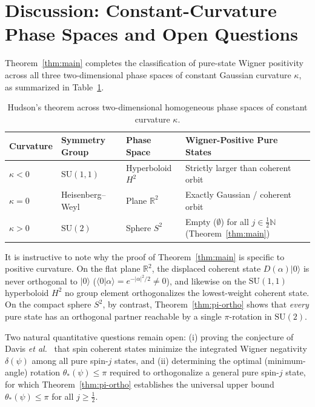 \documentclass[11pt,a4paper]{article}
\theoremstyle{remark}
\newcommand{\ket}[1]{\lvert #1 \rangle}
\newcommand{\braket}[2]{\langle #1 \vert #2 \rangle}
\begin{document}
\section{Discussion: Constant-Curvature Phase Spaces and Open Questions}

Theorem~\ref{thm:main} completes the classification of pure-state Wigner positivity across all three two-dimensional phase spaces of constant Gaussian curvature $\kappa$, as summarized in Table~\ref{tab:trichotomy}.

\begin{table}[h]
\centering
\caption{Hudson's theorem across two-dimensional homogeneous phase spaces of constant curvature $\kappa$.}
\label{tab:trichotomy}
\vspace{4pt}
\small
\begin{tabular}{llll}
\toprule
Curvature & Symmetry Group & Phase Space & Wigner-Positive Pure States \\
\midrule
$\kappa < 0$ & $\mathrm{SU}(1,1)$ & Hyperboloid $H^2$ & Strictly larger than coherent orbit~\cite{Klimov2026,Kam2026} \\
$\kappa = 0$ & Heisenberg--Weyl & Plane $\mathbb{R}^2$ & Exactly Gaussian / coherent orbit~\cite{Hudson1974} \\
$\kappa > 0$ & $\mathrm{SU}(2)$ & Sphere $S^2$ & Empty ($\emptyset$) for all $j \in \frac{1}{2}\mathbb{N}$ (Theorem~\ref{thm:main}) \\
\bottomrule
\end{tabular}
\end{table}

It is instructive to note why the proof of Theorem~\ref{thm:main} is specific to positive curvature. On the flat plane $\mathbb{R}^2$, the displaced coherent state $D(\alpha)\ket{0}$ is never orthogonal to $\ket{0}$ ($\braket{0}{\alpha} = e^{-|\alpha|^2/2} \neq 0$), and likewise on the $\mathrm{SU}(1,1)$ hyperboloid $H^2$ no group element orthogonalizes the lowest-weight coherent state. On the compact sphere $S^2$, by contrast, Theorem~\ref{thm:pi-ortho} shows that \emph{every} pure state has an orthogonal partner reachable by a single $\pi$-rotation in $\mathrm{SU}(2)$.

Two natural quantitative questions remain open: (i) proving the conjecture of Davis \emph{et al.}~\cite{Davis2021,Davis2023} that spin coherent states minimize the integrated Wigner negativity $\delta(\psi)$ among all pure spin-$j$ states, and (ii) determining the optimal (minimum-angle) rotation $\theta_*(\psi) \le \pi$ required to orthogonalize a general pure spin-$j$ state, for which Theorem~\ref{thm:pi-ortho} establishes the universal upper bound $\theta_*(\psi) \le \pi$ for all $j \ge \frac{1}{2}$.
\end{document}
